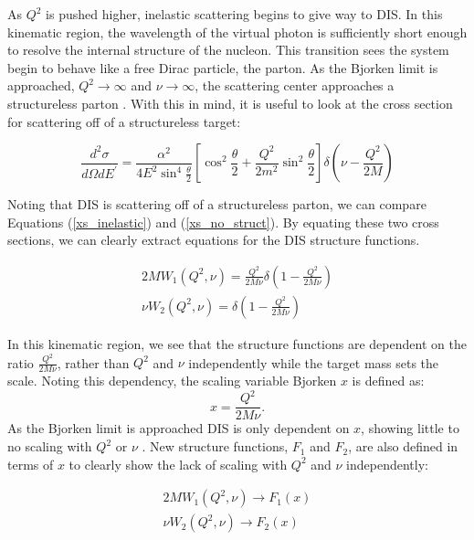 As $Q^2$ is pushed higher, inelastic scattering begins to give way to DIS. In this kinematic region, the wavelength of the virtual photon is sufficiently short enough to resolve the internal structure of the nucleon. This transition sees the system begin to behave like a free Dirac particle, the parton. As the Bjorken limit is approached, $Q^2\rightarrow\infty$ and $\nu\rightarrow\infty$, the scattering center approaches a structureless parton \cite{Bjorken_scaling}. With this in mind, it is useful to look at the cross section for scattering off of a structureless target:

\begin{equation}
	\frac{d^2\sigma}{d\Omega dE^\prime} = \frac{\alpha^2}{4E^{2}\sin^{4}\frac{\theta}{2}} \left[\cos^{2}\frac{\theta}{2} + \frac{Q^2}{2m^2}\sin^{2}\frac{\theta}{2}\right] \delta\left(\nu-\frac{Q^2}{2M}\right)
	\label{xs_no_struct}
\end{equation}

Noting that DIS is scattering off of a structureless parton, we can compare Equations (\ref{xs_inelastic}) and (\ref{xs_no_struct}). By equating these two cross sections, we can clearly extract equations for the DIS structure functions.

\begin{subequations}
\begin{align}
	2MW_1\left(Q^{2},\nu\right) = \frac{Q^2}{2M\nu}\delta\left(1-\frac{Q^2}{2M\nu}\right) \\
	\nu W_2\left(Q^{2},\nu\right) = \delta\left(1-\frac{Q^2}{2M\nu}\right)
\end{align}
\end{subequations}

In this kinematic region, we see that the structure functions are dependent on the ratio $\frac{Q^2}{2M\nu}$, rather than $Q^2$ and $\nu$ independently while the target mass sets the scale. Noting this dependency, the scaling variable Bjorken $x$ is defined as:
\begin{equation}
	x = \frac{Q^2}{2M\nu}.
\end{equation}
As the Bjorken limit is approached DIS is only dependent on $x$, showing little to no scaling with $Q^2$ or $\nu$ \cite{bodek_scaling}. New structure functions, $F_1$ and $F_2$, are also defined in terms of $x$ to clearly show the lack of scaling with $Q^2$ and $\nu$ independently:

\begin{subequations}
\begin{align}
	2MW_1\left(Q^{2},\nu\right) \rightarrow F_{1}\left(x\right) \\
	\nu W_2\left(Q^{2},\nu\right) \rightarrow F_{2}\left(x\right)
\end{align}
\label{eqn:w_to_f}
\end{subequations}

